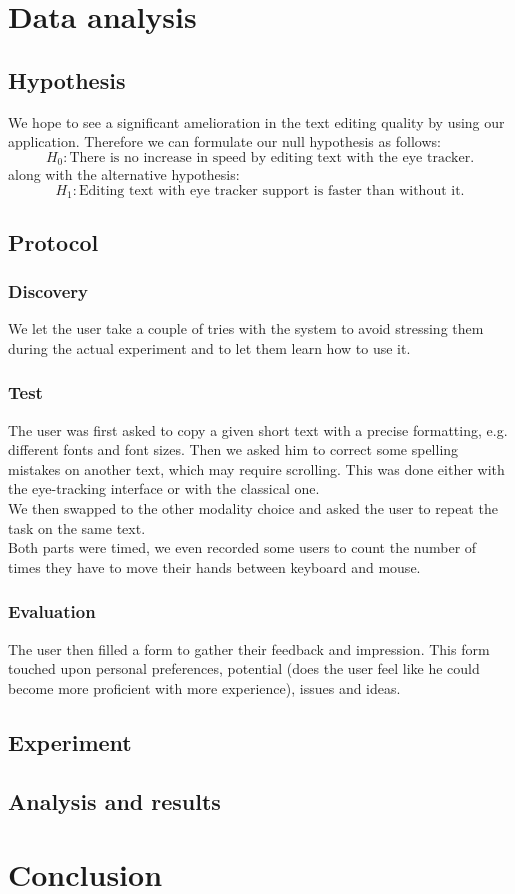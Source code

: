 \documentclass[12pt, a4paper, twoside]{article}
\begin{document}
\section{Data analysis}

\subsection{Hypothesis}
We hope to see a significant amelioration in the text editing quality by using our application. Therefore we can formulate our null hypothesis as follows: 
\[H_0: \text{There is no increase in speed by editing text with the eye tracker.}\] 
along with the alternative hypothesis: 
\[H_1: \text{Editing text with eye tracker support is faster than without it.}\]

\subsection{Protocol}

\subsubsection{Discovery}
We let the user take a couple of tries with the system to avoid stressing them during the actual experiment and to let them learn how to use it. 

\subsubsection{Test}
The user was first asked to copy a given short text with a precise formatting, e.g. different fonts and font sizes. Then we asked him to correct some spelling mistakes on another text, which may require scrolling. This was done either with the eye-tracking interface or with the classical one. \\
We then swapped to the other modality choice and asked the user to repeat the task on the same text. \\
Both parts were timed, we even recorded some users to count the number of times they have to move their hands between keyboard and mouse. 

\subsubsection{Evaluation}
The user then filled a form to gather their feedback and impression. This form touched upon personal preferences, potential (does the user feel like he could become more proficient with more experience), issues and ideas. 

\subsection{Experiment}

\subsection{Analysis and results}

\section{Conclusion}

 
\end{document}
